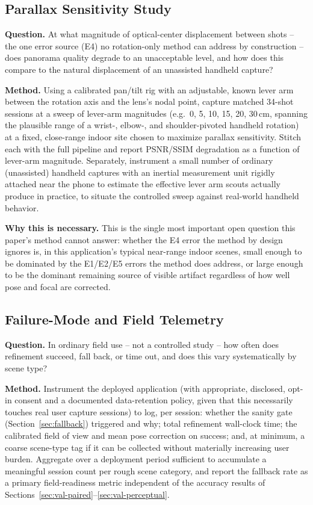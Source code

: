 \documentclass[11pt]{article}
\begin{document}
\subsection{Parallax Sensitivity Study}
\label{sec:val-parallax}

\textbf{Question.} At what magnitude of optical-center displacement between shots -- the one error source (E4) no rotation-only method can address by construction -- does panorama quality degrade to an unacceptable level, and how does this compare to the natural displacement of an unassisted handheld capture?

\textbf{Method.} Using a calibrated pan/tilt rig with an adjustable, known lever arm between the rotation axis and the lens's nodal point, capture matched 34-shot sessions at a sweep of lever-arm magnitudes (e.g.\ 0, 5, 10, 15, 20, 30\,cm, spanning the plausible range of a wrist-, elbow-, and shoulder-pivoted handheld rotation) at a fixed, close-range indoor site chosen to maximize parallax sensitivity. Stitch each with the full pipeline and report PSNR/SSIM degradation as a function of lever-arm magnitude. Separately, instrument a small number of ordinary (unassisted) handheld captures with an inertial measurement unit rigidly attached near the phone to estimate the effective lever arm scouts actually produce in practice, to situate the controlled sweep against real-world handheld behavior.

\textbf{Why this is necessary.} This is the single most important open question this paper's method cannot answer: whether the E4 error the method by design ignores is, in this application's typical near-range indoor scenes, small enough to be dominated by the E1/E2/E5 errors the method does address, or large enough to be the dominant remaining source of visible artifact regardless of how well pose and focal are corrected.

\subsection{Failure-Mode and Field Telemetry}
\label{sec:val-telemetry}

\textbf{Question.} In ordinary field use -- not a controlled study -- how often does refinement succeed, fall back, or time out, and does this vary systematically by scene type?

\textbf{Method.} Instrument the deployed application (with appropriate, disclosed, opt-in consent and a documented data-retention policy, given that this necessarily touches real user capture sessions) to log, per session: whether the sanity gate (Section~\ref{sec:fallback}) triggered and why; total refinement wall-clock time; the calibrated field of view and mean pose correction on success; and, at minimum, a coarse scene-type tag if it can be collected without materially increasing user burden. Aggregate over a deployment period sufficient to accumulate a meaningful session count per rough scene category, and report the fallback rate as a primary field-readiness metric independent of the accuracy results of Sections~\ref{sec:val-paired}--\ref{sec:val-perceptual}.
\end{document}

